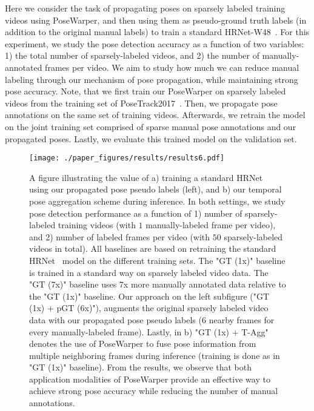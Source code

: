 \documentclass{article}
\begin{document}
Here we consider the task of propagating poses on sparsely labeled training videos using PoseWarper, and then using them as pseudo-ground truth labels (in addition to the original manual labels) to train a standard HRNet-W48~\cite{sun2019deep}. For this experiment, we study the pose detection accuracy as a function of two variables: 1) the total number of sparsely-labeled videos, and 2) the number of manually-annotated frames per video. We aim to study how much we can reduce manual labeling through our mechanism of pose propagation, while maintaining strong pose accuracy. Note, that we first train our PoseWarper on sparsely labeled videos from the training set of PoseTrack2017~\cite{Iqbal_CVPR2017}. Then, we propagate pose annotations on the same set of training videos. Afterwards, we retrain the model on the joint training set comprised of sparse manual pose annotations and our propagated poses. Lastly, we evaluate this trained model on the validation set.


\begin{figure}
\begin{center}
   \texttt{[image: ./paper\_figures/results/results6.pdf]}
\end{center}
\vspace{-0.1cm}
   \caption{A figure illustrating the value of a) training a standard HRNet~\cite{sun2019deep} using our propagated pose pseudo labels (left), and b) our temporal pose aggregation scheme during inference. In both settings, we study pose detection performance as a function of 1) number of sparsely-labeled training videos (with $1$ manually-labeled frame per video), and 2) number of labeled frames per video (with $50$ sparsely-labeled videos in total). All baselines are based on retraining the standard HRNet~\cite{sun2019deep} model on the different training sets. The "GT (1x)" baseline is trained in a standard way on sparsely labeled video data. The "GT (7x)" baseline uses $7$x more manually annotated data relative to the "GT (1x)" baseline. Our approach on the left subfigure ("GT (1x) + pGT (6x)"), augments the original sparsely labeled video data with our propagated pose pseudo labels ($6$ nearby frames for every manually-labeled frame). Lastly, in b) "GT (1x) + T-Agg" denotes the use of PoseWarper to fuse pose information from multiple neighboring frames during inference (training is done as in "GT (1x)" baseline). From the results, we observe that both application modalities of PoseWarper provide an effective way to achieve strong pose accuracy while reducing the number of manual annotations.\vspace{-0.3cm}}\label{results_fig}
\end{figure}
\end{document}
